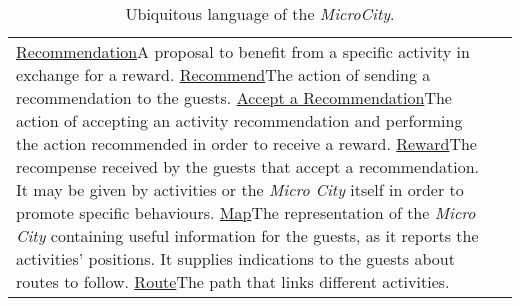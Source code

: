 \begin{longtable}{|l|p{}|}
    \ul{Recommendation}{A proposal to benefit from a specific activity in exchange for a reward.}
    \ul{Recommend}{The action of sending a recommendation to the guests.}
    \ul{Accept a Recommendation}{The action of accepting an activity recommendation and performing the action recommended in order to receive a reward.}
    \ul{Reward}{The recompense received by the guests that accept a recommendation. It may be given by activities or the \textit{Micro City} itself in order to promote specific behaviours.}
    \ul{Map}{The representation of the \textit{Micro City} containing useful information for the guests, as it reports the activities' positions. It supplies indications to the guests about routes to follow.}
    \ul{Route}{The path that links different activities.}
    \caption{Ubiquitous language of the \textit{MicroCity}.}
    \label{tab:ul}
\end{longtable}
